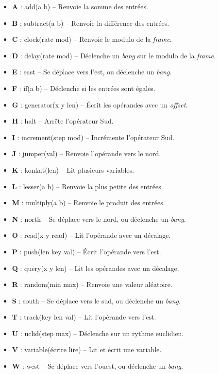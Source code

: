 \documentclass[a4paper]{report}
\begin{document}
\begin{itemize}
\item \textbf{A} : add(a b) -- Renvoie la somme des entrées.
\item \textbf{B} : subtract(a b) -- Renvoie la différence des entrées.
\item \textbf{C} : clock(rate mod) -- Renvoie le modulo de la \textit{frame}.
\item \textbf{D} : delay(rate mod) -- Déclenche un \textit{bang} sur le modulo de la \textit{frame}.
\item \textbf{E} : east -- Se déplace vers l'est, ou déclenche un \textit{bang}.
\item \textbf{F} : if(a b) -- Déclenche si les entrées sont égales.
\item \textbf{G} : generator(x y len) -- Écrit les opérandes avec un \textit{offset}.
\item \textbf{H} : halt -- Arrête l'opérateur Sud.
\item \textbf{I} : increment(step mod) -- Incrémente l'opérateur Sud.
\item \textbf{J} : jumper(val) -- Renvoie l'opérande vers le nord.
\item \textbf{K} : konkat(len) -- Lit plusieurs variables.
\item \textbf{L} : lesser(a b) -- Renvoie la plus petite des entrées.
\item \textbf{M} : multiply(a b) -- Renvoie le produit des entrées.
\item \textbf{N} : north -- Se déplace vers le nord, ou déclenche un \textit{bang}.
\item \textbf{O} : read(x y read) -- Lit l'opérande avec un décalage.
\item \textbf{P} : push(len key val) -- Écrit l'opérande vers l'est.
\item \textbf{Q} : query(x y len) -- Lit les opérandes avec un décalage.
\item \textbf{R} : random(min max) -- Renvoie une valeur aléatoire.
\item \textbf{S} : south -- Se déplace vers le sud, ou déclenche un \textit{bang}.
\item \textbf{T} : track(key len val) -- Lit l'opérande vers l'est.
\item \textbf{U} : uclid(step max) -- Déclenche sur un rythme euclidien.
\item \textbf{V} : variable(écrire lire) -- Lit et écrit une variable.
\item \textbf{W} : west -- Se déplace vers l'ouest, ou déclenche un \textit{bang}.

\end{itemize}
\end{document}
